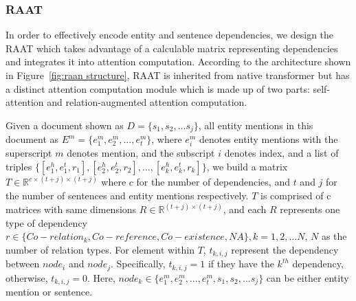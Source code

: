 \documentclass[11pt]{article}
\begin{document}
\subsubsection{RAAT}
In order to effectively encode entity and sentence dependencies, we design the RAAT which takes advantage of a calculable matrix representing dependencies and integrates it into attention computation. According to the architecture shown in Figure~\ref{fig:raan structure}, RAAT is inherited from native transformer but has a distinct attention computation module which is made up of two parts: self-attention and relation-augmented attention computation.

Given a document shown as $D = \{s_1, s_2, ... s_j\}$, all entity mentions in this document as $E^m = \{e^m_{1}, e^m_{2}, ..., e^m_t\}$, where $e^m_i$ denotes entity mentions with the superscript $m$ denotes mention, and the subscript $i$ denotes index,
and a list of triples $\{[e_1^h,e_1^t,r_1],[e_2^h,e_2^t,r_2],...,[e_k^h,e_k^t,r_k]\}$, we build a matrix $T\in \mathbb{R}^{c \times (t + j) \times (t + j)}$ where $c$ for the number of dependencies, and $t$ and $j$ for the number of sentences and entity mentions respectively. $T$ is comprised of c matrices with same dimensions $R\in \mathbb{R}^{(t + j) \times (t + j)}$, and each $R$ represents one type of dependency $r \in \{Co-relation_k, Co-reference, Co-existence, NA\}, k = 1, 2, ... N$, $N$ as the number of relation types. For element within $T$, $t_{k, i, j}$ represent the dependency between $node_i$ and $node_j$. Specifically, $t_{k, i, j} = 1$ if they have the $k^{th}$ dependency, otherwise, $t_{k, i, j} = 0$. Here, $node_k \in \{e^m_{1}, e^m_{2}, ..., e^m_t, s_1, s_2, ... s_j\}$ can be either entity mention or sentence.
\end{document}
